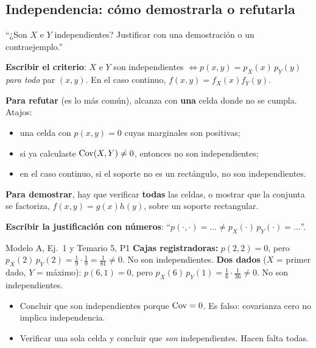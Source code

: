 \subsection{Independencia: cómo demostrarla o refutarla}\label{p:indep}
\begin{cuando}
``¿Son $X$ e $Y$ independientes? Justificar con una demostración o un contraejemplo.''
\end{cuando}
\begin{pasos}
\begin{pasolista}
\item \textbf{Escribir el criterio}: $X$ e $Y$ son independientes $\iff p(x,y)=p_X(x)\,p_Y(y)$ \emph{para todo} par $(x,y)$. En el caso continuo, $f(x,y)=f_X(x)f_Y(y)$.
\item \textbf{Para refutar} (es lo más común), alcanza con \textbf{una} celda donde no se cumpla. Atajos:
\begin{itemize}
\item una celda con $p(x,y)=0$ cuyas marginales son positivas;
\item si ya calculaste $\mathrm{Cov}(X,Y)\neq0$, entonces no son independientes;
\item en el caso continuo, si el soporte no es un rectángulo, no son independientes.
\end{itemize}
\item \textbf{Para demostrar}, hay que verificar \textbf{todas} las celdas, o mostrar que la conjunta se factoriza, $f(x,y)=g(x)h(y)$, sobre un soporte rectangular.
\item \textbf{Escribir la justificación con números}: ``$p(\cdot,\cdot)=\ldots\neq p_X(\cdot)\,p_Y(\cdot)=\ldots$''.
\end{pasolista}
\end{pasos}
\begin{modelo}{Modelo A, Ej.\ 1 y Temario 5, P1}
\textbf{Cajas registradoras:} $p(2,2)=0$, pero $p_X(2)\,p_Y(2)=\frac19\cdot\frac19=\frac1{81}\neq0$. No son independientes.
\textbf{Dos dados} ($X$ = primer dado, $Y$ = máximo): $p(6,1)=0$, pero $p_X(6)\,p_Y(1)=\frac16\cdot\frac1{36}\neq0$. No son independientes.
\end{modelo}
\begin{ojo}
\begin{itemize}
\item Concluir que son independientes porque $\mathrm{Cov}=0$. Es falso: covarianza cero no implica independencia.
\item Verificar una sola celda y concluir que \emph{son} independientes. Hacen falta todas.
\end{itemize}
\end{ojo}

